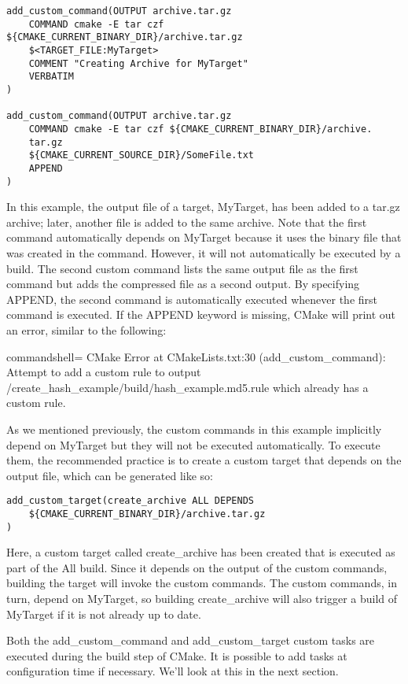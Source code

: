 \begin{lstlisting}[style=styleCMake]
add_custom_command(OUTPUT archive.tar.gz
	COMMAND cmake -E tar czf ${CMAKE_CURRENT_BINARY_DIR}/archive.tar.gz
	$<TARGET_FILE:MyTarget>
	COMMENT "Creating Archive for MyTarget"
	VERBATIM
)

add_custom_command(OUTPUT archive.tar.gz
	COMMAND cmake -E tar czf ${CMAKE_CURRENT_BINARY_DIR}/archive.
	tar.gz
	${CMAKE_CURRENT_SOURCE_DIR}/SomeFile.txt
	APPEND
)
\end{lstlisting}

In this example, the output file of a target, MyTarget, has been added to a tar.gz archive; later, another file is added to the same archive. Note that the first command automatically depends on MyTarget because it uses the binary file that was created in the  command. However, it will not automatically be executed by a build. The second custom command lists the same output file as the first command but adds the compressed file as a second output. By specifying APPEND, the second command is automatically executed whenever the first command is executed. If the APPEND keyword is missing, CMake will print out an error, similar to the following:

\begin{tcblisting}{commandshell={}}
CMake Error at CMakeLists.txt:30 (add_custom_command):
  Attempt to add a custom rule to output
    /create_hash_example/build/hash_example.md5.rule
  which already has a custom rule.
\end{tcblisting}

As we mentioned previously, the custom commands in this example implicitly depend on MyTarget but they will not be executed automatically. To execute them, the recommended practice is to create a custom target that depends on the output file, which can be generated like so:

\begin{lstlisting}[style=styleCMake]
add_custom_target(create_archive ALL DEPENDS
	${CMAKE_CURRENT_BINARY_DIR}/archive.tar.gz
)
\end{lstlisting}

Here, a custom target called create\_archive has been created that is executed as part of the All build. Since it depends on the output of the custom commands, building the target will invoke the custom commands. The custom commands, in turn, depend on MyTarget, so building create\_archive will also trigger a build of MyTarget if it is not already up to date.

Both the add\_custom\_command and add\_custom\_target custom tasks are executed during the build step of CMake. It is possible to add tasks at configuration time if necessary. We'll look at this in the next section.

